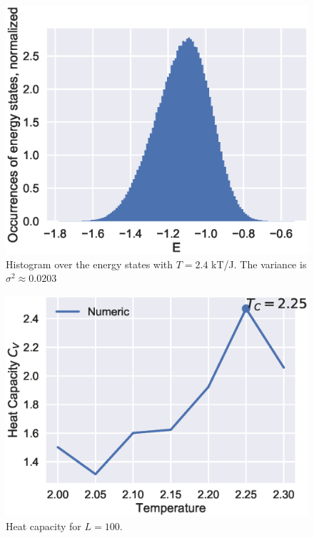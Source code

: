 \documentclass[aps,reprint]{revtex4-1}
\begin{document}
\begin{figure}[H]
  \centering
  \includegraphics[width=\columnwidth]{figures/4db.eps}
  \caption{\label{fig:4db} Histogram over the energy states with \(T=2.4\) kT/J.
  The variance is \(\sigma^{2} \approx 0.0203\)}
\end{figure}

\begin{figure}[H]
  \centering
  \includegraphics[width=\columnwidth]{figures/L100Cv.eps}
  \caption{\label{fig:100CVTc} Heat capacity for \(L=100\).}
\end{figure}
\end{document}
